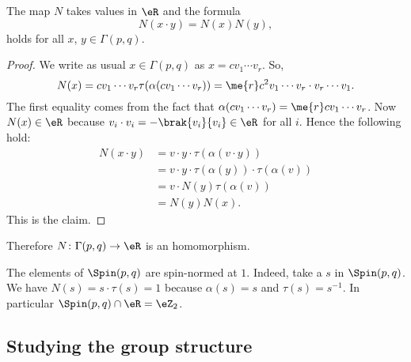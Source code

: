 \begin{proposition} \label{proppourN}
	The map $N$ takes values in $\eR$ and the formula
	\begin{equation}
		N(x\cdot y)=N(x)N(y),
	\end{equation}
	holds for all $x$, $y\in\Gamma(p,q)$.
\end{proposition}

\begin{proof}
	We write as usual $x\in\Gamma(p,q)$ as $x=cv_1\cdots v_r$. So,
	\begin{equation}
		N(x)=cv_1\cdots v_r\tau(\alpha(cv_1\cdots v_r))
		=\me{r}c^2v_1\cdots v_r\cdot v_r\cdots v_1.
	\end{equation}
	The first equality comes from the fact that $\alpha(cv_1\cdots v_r)=\me{r}cv_1\cdots v_r$. Now $N(x)\in\eR$ because $v_i\cdot v_i=-\brak{v_i}{v_i}\in\eR$ for all $i$. Hence the following hold:
	\begin{equation}
		\begin{split}
			N(x\cdot y) & =v\cdot y\cdot\tau(\alpha(v\cdot y))              \\
			            & =v\cdot y\cdot\tau(\alpha(y))\cdot\tau(\alpha(v)) \\
			            & =v\cdot N(y)\tau(\alpha(v))                       \\
			            & =N(y)N(x).
		\end{split}
	\end{equation}
	This is the claim.
\end{proof}

Therefore  $N\colon \Gamma(p,q)\to \eR$ is an homomorphism.

\begin{remark}
	The elements of $\Spin(p,q)$ are spin-normed at $1$. Indeed, take a $s$ in $\Spin(p,q)$. We have $N(s)=s\cdot \tau(s)=1$ because $\alpha(s)=s$ and $\tau(s)=s^{-1}$. In particular $\Spin(p,q)\cap\eR=\eZ_{2}$.
	\label{rem:spin_norm_u}
\end{remark}

\subsection{Studying the group structure}

